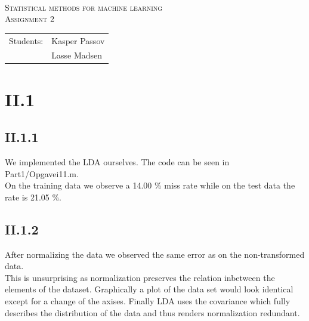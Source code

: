 \documentclass{article}
\begin{document}
\begin{titlepage}
\begin{center}
    \hline \\[0.2cm]
\textsc{\Large Statistical methods for machine learning}\\[0.5cm]
\textsc{\large Assignment 2}\\[0.5cm]
    \hline
    \hline
\vspace{2 cm}
\begin{tabular}{ll}
Students: & Kasper Passov\\
          & Lasse Madsen\\ 
\end{tabular}
\end{center}
\vspace{5 cm}
\newpage
\end{titlepage}

\section{II.1}

\subsection{II.1.1}

We implemented the LDA ourselves. The code can be seen in
Part1/Opgavei11.m. \\
On the training data we observe a 14.00 \% miss rate while on the test data
the rate is 21.05 \%.

\subsection{II.1.2}

After normalizing the data we observed the same error as on the
non-transformed data. \\
This is unsurprising as normalization preserves the relation inbetween
the elements of the dataset. Graphically a plot of the data set would
look identical except for a change of the axises. Finally LDA uses the
covariance which fully describes the distribution of the data and thus
renders normalization redundant.
\end{document}
